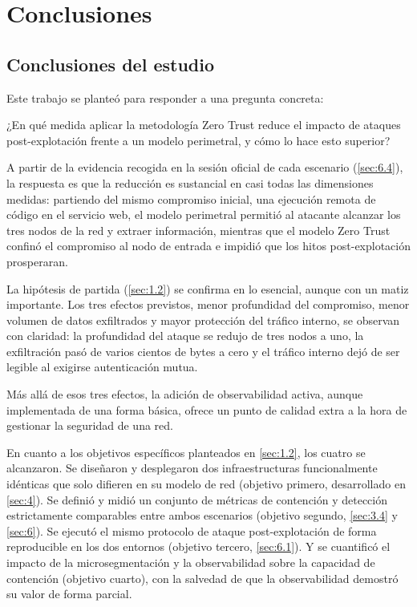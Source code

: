\documentclass[11pt,spanish,listoffigures,listoftables]{tfgetsinf}
\begin{document}

\chapter{Conclusiones}

        \section{Conclusiones del estudio}
        Este trabajo se planteó para responder a una pregunta concreta:

        \begin{tcolorbox}[
            enhanced,
            frame hidden,
            borderline west={3pt}{0pt}{gray!70!black},
            sharp corners
        ]
            ¿En qué medida aplicar la metodología Zero Trust reduce el impacto de ataques post-explotación frente a un modelo perimetral, y cómo lo hace esto superior?
        \end{tcolorbox}

        A partir de la evidencia recogida en la sesión oficial de cada escenario (\cref{sec:6.4}), la respuesta es que la reducción es sustancial en casi todas las dimensiones medidas: partiendo del mismo compromiso inicial, una ejecución remota de código en el servicio web, el modelo perimetral permitió al atacante alcanzar los tres nodos de la red y extraer información, mientras que el modelo Zero Trust confinó el compromiso al nodo de entrada e impidió que los hitos post-explotación prosperaran.

        La hipótesis de partida (\cref{sec:1.2}) se confirma en lo esencial, aunque con un matiz importante. Los tres efectos previstos, menor profundidad del compromiso, menor volumen de datos exfiltrados y mayor protección del tráfico interno, se observan con claridad: la profundidad del ataque se redujo de tres nodos a uno, la exfiltración pasó de varios cientos de bytes a cero y el tráfico interno dejó de ser legible al exigirse autenticación mutua.

        Más allá de esos tres efectos, la adición de observabilidad activa, aunque implementada de una forma básica, ofrece un punto de calidad extra a la hora de gestionar la seguridad de una red.

        En cuanto a los objetivos específicos planteados en \cref{sec:1.2}, los cuatro se alcanzaron. Se diseñaron y desplegaron dos infraestructuras funcionalmente idénticas que solo difieren en su modelo de red (objetivo primero, desarrollado en \cref{sec:4}). Se definió y midió un conjunto de métricas de contención y detección estrictamente comparables entre ambos escenarios (objetivo segundo, \cref{sec:3.4} y \cref{sec:6}). Se ejecutó el mismo protocolo de ataque post-explotación de forma reproducible en los dos entornos (objetivo tercero, \cref{sec:6.1}). Y se cuantificó el impacto de la microsegmentación y la observabilidad sobre la capacidad de contención (objetivo cuarto), con la salvedad de que la observabilidad demostró su valor de forma parcial.
\end{document}
